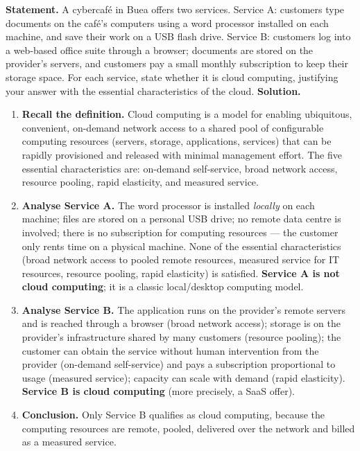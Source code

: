 \documentclass[11pt]{article}
\begin{document}
\begin{exoresolu}
\textbf{Statement.} A cybercaf\'e in Buea offers two services. Service A: customers type documents on the caf\'e's computers using a word processor installed on each machine, and save their work on a USB flash drive. Service B: customers log into a web-based office suite through a browser; documents are stored on the provider's servers, and customers pay a small monthly subscription to keep their storage space. For each service, state whether it is cloud computing, justifying your answer with the essential characteristics of the cloud.
\tcblower
\textbf{Solution.}
\begin{enumerate}
\item \textbf{Recall the definition.} Cloud computing is a model for enabling ubiquitous, convenient, on-demand network access to a shared pool of configurable computing resources (servers, storage, applications, services) that can be rapidly provisioned and released with minimal management effort. The five essential characteristics are: on-demand self-service, broad network access, resource pooling, rapid elasticity, and measured service.
\item \textbf{Analyse Service A.} The word processor is installed \emph{locally} on each machine; files are stored on a personal USB drive; no remote data centre is involved; there is no subscription for computing resources --- the customer only rents time on a physical machine. None of the essential characteristics (broad network access to pooled remote resources, measured service for IT resources, resource pooling, rapid elasticity) is satisfied. \textbf{Service A is not cloud computing}; it is a classic local/desktop computing model.
\item \textbf{Analyse Service B.} The application runs on the provider's remote servers and is reached through a browser (broad network access); storage is on the provider's infrastructure shared by many customers (resource pooling); the customer can obtain the service without human intervention from the provider (on-demand self-service) and pays a subscription proportional to usage (measured service); capacity can scale with demand (rapid elasticity). \textbf{Service B is cloud computing} (more precisely, a SaaS offer).
\item \textbf{Conclusion.} Only Service B qualifies as cloud computing, because the computing resources are remote, pooled, delivered over the network and billed as a measured service.
\end{enumerate}
\end{exoresolu}
\end{document}
